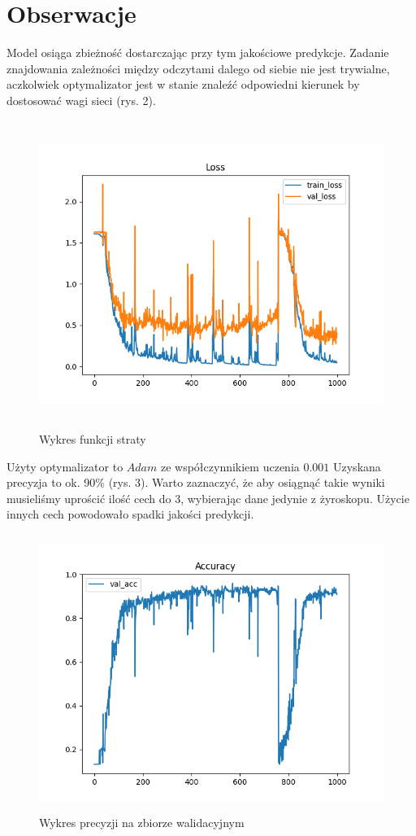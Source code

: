 \documentclass[10pt]{article}
\begin{document}
\section{Obserwacje}

Model osiąga zbieżność dostarczając przy tym jakościowe predykcje. Zadanie znajdowania zależności między odczytami dalego od siebie nie jest trywialne, aczkolwiek optymalizator jest w stanie znaleźć odpowiedni kierunek by dostosować wagi sieci (rys. 2).


\begin{figure}[H]
  \includegraphics[height=10cm]{loss.png}
  \centering
  \caption{Wykres funkcji straty}
\end{figure}

Użyty optymalizator to $Adam$ ze współczynnikiem uczenia $0.001$
 Uzyskana precyzja to ok. 90\% (rys. 3). Warto zaznaczyć, że aby osiągnąć takie wyniki musieliśmy uprościć ilość cech do 3, wybierając dane jedynie z żyroskopu. Użycie innych cech powodowało spadki jakości predykcji.

 \begin{figure}[H]
  \includegraphics[height=9cm]{acc.png}
  \centering
  \caption{Wykres precyzji na zbiorze walidacyjnym}
\end{figure}
\end{document}
